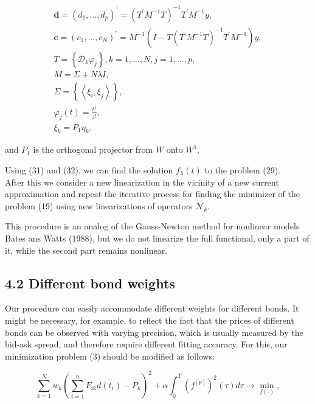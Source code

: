 \documentclass[10pt]{article}
\begin{document}
\begin{gather*}
\mathbf{d}=\left(d_{1}, \ldots, d_{p}\right)^{\prime}=\left(T^{\prime} M^{-1} T\right)^{-1} T^{\prime} M^{-1} y,  \tag{31}\\
\mathbf{c}=\left(c_{1}, \ldots, c_{N}\right)^{\prime}=M^{-1}\left(I-T\left(T^{\prime} M^{-1} T\right)^{-1} T^{\prime} M^{-1}\right) y,  \tag{32}\\
T=\left\{\mathcal{D}_{k} \varphi_{j}\right\}, k=1, \ldots, N, j=1, \ldots, p,  \tag{33}\\
M=\Sigma+N \lambda I,  \tag{34}\\
\Sigma=\left\{\left\langle\xi_{i}, \xi_{j}\right\rangle\right\},  \tag{35}\\
\varphi_{j}(t)=\frac{t^{j}}{j!},  \tag{36}\\
\xi_{k}=P_{1} \eta_{k}, \tag{37}
\end{gather*}


and $P_{1}$ is the orthogonal projector from $W$ onto $W^{1}$.

Using (31) and (32), we can find the solution $f_{\lambda}(t)$ to the problem (29).\\
After this we consider a new linearization in the vicinity of a new current approximation and repeat the iterative process for finding the minimizer of the problem (19) using new linearizations of operators $\mathcal{N}_{k}$.

This procedure is an analog of the Gauss-Newton method for nonlinear models Bates ans Watts (1988), but we do not linearize the full functional, only a part of it, while the second part remains nonlinear.

\subsection*{4.2 Different bond weights}
Our procedure can easily accommodate different weights for different bonds. It might be necessary, for example, to reflect the fact that the prices of different bonds can be observed with varying precision, which is usually measured by the bid-ask spread, and therefore require different fitting accuracy. For this, our minimization problem (3) should be modified as follows:


\begin{equation*}
\sum_{k=1}^{N} w_{k}\left(\sum_{i=1}^{n} F_{i k} d\left(t_{i}\right)-P_{k}\right)^{2}+\alpha \int_{0}^{T}\left(f^{[p]}\right)^{2}(\tau) d \tau \rightarrow \min _{f(\cdot)}, \tag{38}
\end{equation*}
\end{document}
